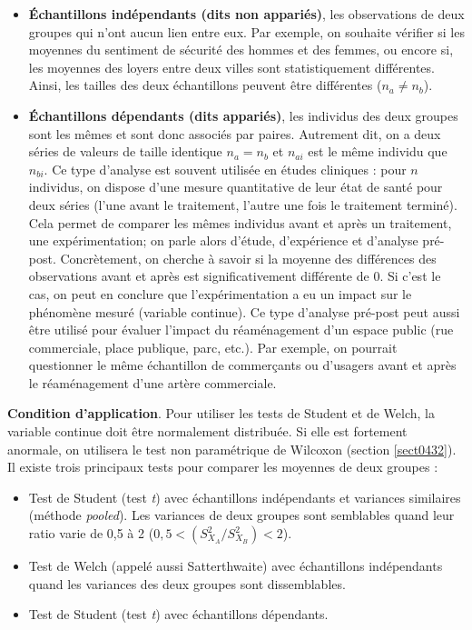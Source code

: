 \documentclass[
  11pt,
  french,
]{book}
\providecommand{\tightlist}{%
  \setlength{\itemsep}{0pt}\setlength{\parskip}{0pt}}
\begin{document}
\begin{itemize}
\item
  \textbf{Échantillons indépendants (dits non appariés)}, les observations de deux groupes qui n'ont aucun lien entre eux. Par exemple, on souhaite vérifier si les moyennes du sentiment de sécurité des hommes et des femmes, ou encore si, les moyennes des loyers entre deux villes sont statistiquement différentes. Ainsi, les tailles des deux échantillons peuvent être différentes (\(n_a \neq n_b\)).
\item
  \textbf{Échantillons dépendants (dits appariés)}, les individus des deux groupes sont les mêmes et sont donc associés par paires. Autrement dit, on a deux séries de valeurs de taille identique \(n_a = n_b\) et \(n_{ai}\) est le même individu que \(n_{bi}\). Ce type d'analyse est souvent utilisée en études cliniques : pour \(n\) individus, on dispose d'une mesure quantitative de leur état de santé pour deux séries (l'une avant le traitement, l'autre une fois le traitement terminé). Cela permet de comparer les mêmes individus avant et après un traitement, une expérimentation; on parle alors d'étude, d'expérience et d'analyse pré-post. Concrètement, on cherche à savoir si la moyenne des différences des observations avant et après est significativement différente de 0. Si c'est le cas, on peut en conclure que l'expérimentation a eu un impact sur le phénomène mesuré (variable continue). Ce type d'analyse pré-post peut aussi être utilisé pour évaluer l'impact du réaménagement d'un espace public (rue commerciale, place publique, parc, etc.). Par exemple, on pourrait questionner le même échantillon de commerçants ou d'usagers avant et après le réaménagement d'une artère commerciale.
\end{itemize}

\textbf{Condition d'application}. Pour utiliser les tests de Student et de Welch, la variable continue doit être normalement distribuée. Si elle est fortement anormale, on utilisera le test non paramétrique de Wilcoxon (section \ref{sect0432}). Il existe trois principaux tests pour comparer les moyennes de deux groupes :

\begin{itemize}
\tightlist
\item
  Test de Student (test \emph{t}) avec échantillons indépendants et variances similaires (méthode \emph{pooled}). Les variances de deux groupes sont semblables quand leur ratio varie de 0,5 à 2 (\(0,5< (S^2_{X_A}/S^2_{X_B})<2\)).
\item
  Test de Welch (appelé aussi Satterthwaite) avec échantillons indépendants quand les variances des deux groupes sont dissemblables.
\item
  Test de Student (test \emph{t}) avec échantillons dépendants.
\end{itemize}
\end{document}
